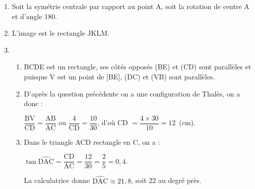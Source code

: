 \begin{enumerate}
\item %
Soit la symétrie centrale par rapport au point A, soit la rotation de centre A et d'angle 180\degres .
\item %
L'image est le rectangle JKLM.

%
%
%
\item
	\begin{enumerate}
		\item %
BCDE est un rectangle, ses côtés opposés (BE) et (CD) sont parallèles et puisque V est un point de [BE], (DC) et (VB) sont parallèles.
		\item %
		D'après la question précédente on a une configuration de Thalès, on a donc :
		
$\dfrac{\text{BV}}{\text{CD}} = \dfrac{\text{AB}}{\text{AC}}$ ou $\dfrac{4}{\text{CD}} = \dfrac{10}{30}$, d'où CD $ = \dfrac{4 \times 30}{10} = 12$~(cm).
		\item %
		Dans le triangle ACD rectangle en C, on a :
		
		$\tan \widehat{\text{DAC}} = \dfrac{\text{CD}}{\text{AC}} = \dfrac{12}{30} = \dfrac{2}{5} = 0,4$.
		
		La calculatrice donne $\widehat{\text{DAC}} \approx 21,8$, soit 22\degres{} au degré près.
	\end{enumerate}
\end{enumerate}
\bigskip

